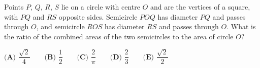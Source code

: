 Points $P$, $Q$, $R$, $S$ lie on a circle with centre $O$ and are the vertices of a square, with $PQ$ and $RS$ opposite sides. Semicircle $POQ$ has diameter $PQ$ and passes through $O$, and semicircle $ROS$ has diameter $RS$ and passes through $O$. What is the ratio of the combined areas of the two semicircles to the area of circle $O$?

$\textbf{(A) }\dfrac{\sqrt2}{4}\qquad\textbf{(B) }\dfrac{1}{2}\qquad\textbf{(C) }\dfrac{2}{\pi}\qquad\textbf{(D) }\dfrac{2}{3}\qquad\textbf{(E) }\dfrac{\sqrt2}{2}$
